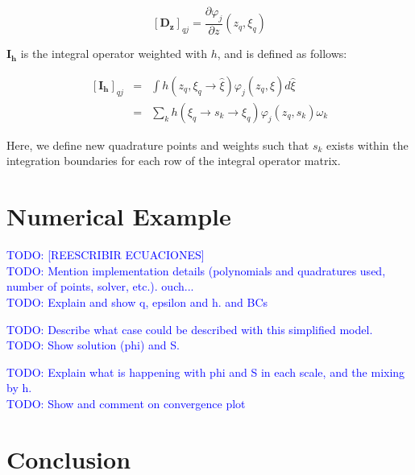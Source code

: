 \documentclass{CFD2011}
\newcommand{\TODO}[1]{\textcolor{blue}{TODO: #1} \\}
\begin{document}
\begin{equation}
\left[\mathbf{D_z}\right]_{qj}=\frac{\partial \varphi_j}{\partial z}(z_q,\xi_q)
\end{equation}

$\mathbf{I_h}$ is the integral operator weighted with $h$, and is defined as follows:

\begin{eqnarray}
\left[\mathbf{I_h}\right]_{qj}&=&\int h(z_q,\xi_q\rightarrow\hat{\xi})\varphi_j(z_q,\hat{\xi}) d\hat{\xi}\nonumber \\
&=&\sum_k h(\xi_q\rightarrow s_k \rightarrow\xi_q)\varphi_j(z_q,s_k) \omega_k
\end{eqnarray}

Here, we define new quadrature points and weights such that $s_k$ exists within the integration boundaries for each row of the integral operator matrix.

\section{Numerical Example}

\TODO{[REESCRIBIR ECUACIONES]}

\TODO{Mention implementation details (polynomials and quadratures used, number of points, solver, etc.).  ouch... }

\TODO{Explain and show q, epsilon and h. and BCs}


\TODO{Describe what case could be described with this simplified model.}

\TODO{Show solution (phi) and S.}


\TODO{Explain what is happening with phi and S in each scale, and the mixing by h.}

\TODO{Show and comment on convergence plot}


\section{Conclusion}
\end{document}
